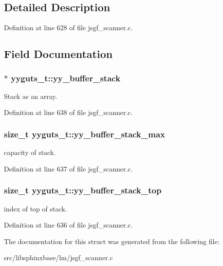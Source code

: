 \subsection{Detailed Description}


Definition at line 628 of file jsgf\-\_\-scanner.\-c.



\subsection{Field Documentation}
\subsubsection[{yy\-\_\-buffer\-\_\-stack}]{$\ast$ yyguts\-\_\-t\-::yy\-\_\-buffer\-\_\-stack}\label{structyyguts__t_ad0b9d576189d518a4482f20ed9b2a416}


Stack as an array. 



Definition at line 638 of file jsgf\-\_\-scanner.\-c.

\subsubsection[{yy\-\_\-buffer\-\_\-stack\-\_\-max}]{\setlength{\rightskip}{0pt plus 5cm}size\-\_\-t yyguts\-\_\-t\-::yy\-\_\-buffer\-\_\-stack\-\_\-max}\label{structyyguts__t_a4435bb91e87f9988b096afc21386289a}


capacity of stack. 



Definition at line 637 of file jsgf\-\_\-scanner.\-c.

\subsubsection[{yy\-\_\-buffer\-\_\-stack\-\_\-top}]{\setlength{\rightskip}{0pt plus 5cm}size\-\_\-t yyguts\-\_\-t\-::yy\-\_\-buffer\-\_\-stack\-\_\-top}\label{structyyguts__t_af92507d904af2fcd4509acde654a9850}


index of top of stack. 



Definition at line 636 of file jsgf\-\_\-scanner.\-c.



The documentation for this struct was generated from the following file\-:\begin{DoxyCompactItemize}
\item 
src/libsphinxbase/lm/jsgf\-\_\-scanner.\-c\end{DoxyCompactItemize}

